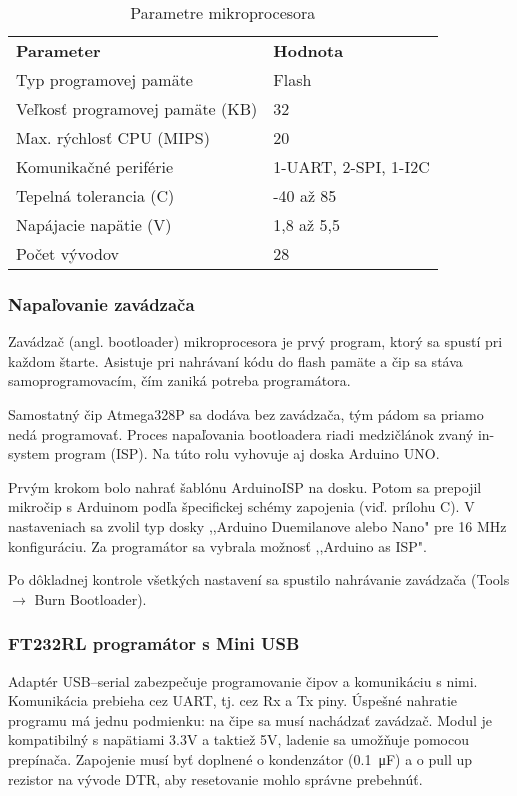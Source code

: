 \documentclass[titlepage,12pt]{article}
\begin{document}
\begin{table}[htb]
\begin{tabular}{ll}
\textbf{Parameter}              & \textbf{Hodnota}     \\
Typ programovej pamäte          & Flash                \\
Veľkosť programovej pamäte (KB) & 32                   \\
Max. rýchlosť CPU (MIPS)        & 20                   \\
Komunikačné periférie           & 1-UART, 2-SPI, 1-I2C \\
Tepelná tolerancia (C)          & -40 až 85            \\
Napájacie napätie (V)           & 1,8 až 5,5           \\
Počet vývodov                   & 28                  
\end{tabular}
\caption{Parametre mikroprocesora}
\end{table}

\subsubsection*{Napaľovanie zavádzača}
Zavádzač (angl. bootloader) mikroprocesora je prvý program, ktorý sa spustí pri každom štarte. Asistuje pri nahrávaní kódu do flash pamäte a čip sa stáva samoprogramovacím, čím zaniká potreba programátora.

Samostatný čip Atmega328P sa dodáva bez zavádzača, tým pádom sa priamo nedá programovať. Proces napaľovania bootloadera riadi medzičlánok zvaný in-system program (ISP). Na túto rolu vyhovuje aj doska Arduino UNO.

Prvým krokom bolo nahrať šablónu ArduinoISP na dosku. Potom sa prepojil mikročip \linebreak s Arduinom podľa špecifickej schémy zapojenia (viď. prílohu C). V nastaveniach sa zvolil typ dosky ,,Arduino Duemilanove alebo Nano" pre 16 MHz konfiguráciu. Za programátor sa \linebreak vybrala možnosť ,,Arduino as ISP".

Po dôkladnej kontrole všetkých nastavení sa spustilo nahrávanie zavádzača (Tools $\rightarrow$ Burn Bootloader).


\newpage
\subsubsection*{FT232RL programátor s Mini USB}
Adaptér USB–serial zabezpečuje programovanie čipov a komunikáciu s nimi. Komunikácia prebieha cez UART, tj. cez Rx a Tx piny. Úspešné nahratie programu má jednu podmienku: na čipe sa musí nachádzať zavádzač. Modul je kompatibilný s napätiami 3.3V a taktiež 5V, ladenie sa umožňuje pomocou prepínača. Zapojenie musí byť doplnené o kondenzátor (\SI{0,1}{\micro\F}) a o pull up rezistor na vývode DTR, aby resetovanie mohlo správne prebehnúť.
\end{document}
